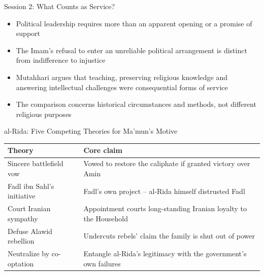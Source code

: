 \begin{frame}{Session 2: What Counts as Service?}
\begin{itemize}[itemsep=5pt]
  \item Political leadership requires more than an apparent opening or a promise of support
  \item The Imam's refusal to enter an unreliable political arrangement is distinct from indifference to injustice
  \item Mutahhari argues that teaching, preserving religious knowledge and answering intellectual challenges were consequential forms of service
  \item The comparison concerns historical circumstances and methods, not different religious purposes
\end{itemize}
\end{frame}


\begin{frame}{al-Rida: Five Competing Theories for Ma'mun's Motive}
\centering\scriptsize
\renewcommand{\arraystretch}{1.5}
\begin{tabular}{|p{3.6cm}|p{6.8cm}|}
\hline
\textbf{Theory} & \textbf{Core claim} \\\hline
Sincere battlefield vow & Vowed to restore the caliphate if granted victory over Amin \\\hline
Fadl ibn Sahl's initiative & Fadl's own project -- al-Rida himself distrusted Fadl \\\hline
Court Iranian sympathy & Appointment courts long-standing Iranian loyalty to the Household \\\hline
Defuse Alawid rebellion & Undercuts rebels' claim the family is shut out of power \\\hline
Neutralize by co-optation & Entangle al-Rida's legitimacy with the government's own failures \\\hline
\end{tabular}
\vspace{0.3cm}
\end{frame}

